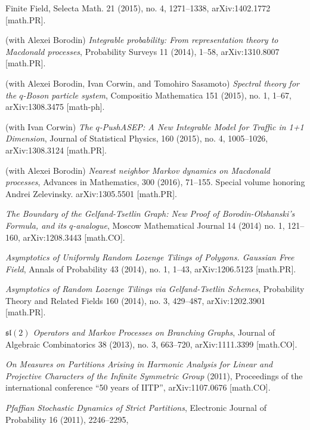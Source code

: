 \documentclass[letterpaper,11pt]{article}
\begin{document}
\begin{etaremune}
{		      Finite Field},
	      Selecta Math. 21 (2015), no. 4, 1271--1338, arXiv:1402.1772
	      [math.PR].
	\item
	      (with Alexei Borodin)
	      \emph{Integrable probability: From representation theory to
		      Macdonald processes},
	      Probability Surveys 11 (2014), 1--58, arXiv:1310.8007 [math.PR].
	\item
	      (with Alexei Borodin, Ivan Corwin, and Tomohiro Sasamoto)
	      \emph{Spectral theory for the $q$-Boson particle system},
	      Compositio Mathematica 151 (2015), no. 1, 1--67, arXiv:1308.3475
	      [math-ph].
	\item
	      (with Ivan Corwin)
	      \emph{The $q$-PushASEP: A New Integrable Model for Traffic in
		      1+1 Dimension},
	      Journal of Statistical Physics, 160 (2015), no. 4, 1005--1026,
	      arXiv:1308.3124 [math.PR].
	\item
	      (with Alexei Borodin)
	      \emph{Nearest neighbor Markov dynamics on Macdonald processes},
	      Advances in Mathematics, 300 (2016), 71--155. Special volume
	      honoring Andrei Zelevinsky. arXiv:1305.5501 [math.PR].
	\item
	      \emph{The Boundary of the Gelfand-Tsetlin Graph: New Proof of
		      Borodin-Olshanski's Formula, and its $q$-analogue},
	      Moscow Mathematical Journal 14 (2014) no. 1, 121--160,
	      arXiv:1208.3443 [math.CO].
	\item
	      \emph{Asymptotics of Uniformly Random Lozenge Tilings of
		      Polygons. Gaussian Free Field},
	      Annals of Probability 43 (2014), no. 1, 1--43, arXiv:1206.5123
	      [math.PR].
	\item
	      \emph{Asymptotics of Random Lozenge Tilings via Gelfand-Tsetlin
		      Schemes},
	      Probability Theory and Related Fields 160 (2014), no. 3,
	      429--487, arXiv:1202.3901 [math.PR].
	\item
	      \emph{$\mathfrak{sl}(2)$
		      Operators and Markov Processes on Branching Graphs},
	      Journal of Algebraic Combinatorics 38 (2013), no. 3, 663--720,
	      arXiv:1111.3399 [math.CO].
	\item
	      \emph{On Measures on Partitions Arising in Harmonic Analysis for
		      Linear and Projective Characters of the Infinite Symmetric Group} (2011),
	      Proceedings of the international conference ``50 years of
	      IITP'', arXiv:1107.0676 [math.CO].
	\item
	      \emph{Pfaffian Stochastic Dynamics of Strict Partitions},
	      Electronic Journal of Probability 16 (2011), 2246--2295,

\end{etaremune}
\end{document}
